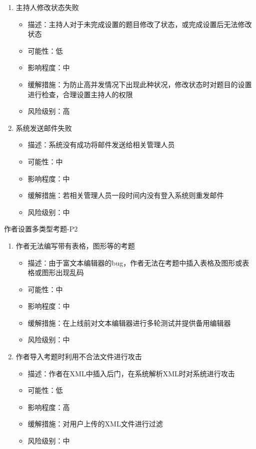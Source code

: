 \documentclass[hyperref, a4paper]{ctexart}
\providecommand{\tightlist}{%
  \setlength{\itemsep}{0pt}\setlength{\parskip}{0pt}}
\begin{document}
\begin{enumerate}
\def\labelenumi{\arabic{enumi}.}
\tightlist
\item
  主持人修改状态失败

  \begin{itemize}
  \tightlist
  \item
    描述：主持人对于未完成设置的题目修改了状态，或完成设置后无法修改状态
  \item
    可能性：低
  \item
    影响程度：中
  \item
    缓解措施：为防止高并发情况下出现此种状况，修改状态时对题目的设置进行检查，合理设置主持人的权限
  \item
    风险级别：高
  \end{itemize}
\item
  系统发送邮件失败

  \begin{itemize}
  \tightlist
  \item
    描述：系统没有成功将邮件发送给相关管理人员
  \item
    可能性：中
  \item
    影响程度：中
  \item
    缓解措施：若相关管理人员一段时间内没有登入系统则重发邮件
  \item
    风险级别：中
  \end{itemize}
\end{enumerate}

作者设置多类型考题-P2

\begin{enumerate}
\def\labelenumi{\arabic{enumi}.}
\tightlist
\item
  作者无法编写带有表格，图形等的考题

  \begin{itemize}
  \tightlist
  \item
    描述：由于富文本编辑器的bug，作者无法在考题中插入表格及图形或表格或图形出现乱码
  \item
    可能性：中
  \item
    影响程度：中
  \item
    缓解措施：在上线前对文本编辑器进行多轮测试并提供备用编辑器
  \item
    风险级别：中
  \end{itemize}
\item
  作者导入考题时利用不合法文件进行攻击

  \begin{itemize}
  \tightlist
  \item
    描述：作者在XML中插入后门，在系统解析XML时对系统进行攻击
  \item
    可能性：低
  \item
    影响程度：高
  \item
    缓解措施：对用户上传的XML文件进行过滤
  \item
    风险级别：中
  \end{itemize}
\end{enumerate}
\end{document}
